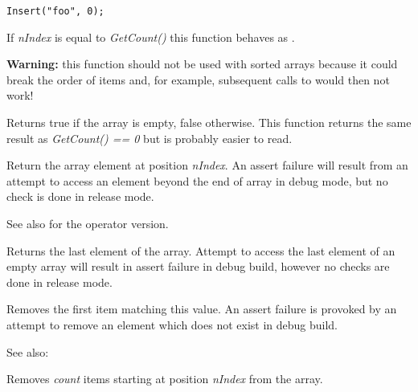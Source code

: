 \begin{verbatim}
Insert("foo", 0);
\end{verbatim}

If {\it nIndex} is equal to {\it GetCount()} this function behaves as 
.

{\bf Warning:} this function should not be used with sorted arrays because it
could break the order of items and, for example, subsequent calls to 
 would then not work!

\label{wxarraystringisempty}


Returns true if the array is empty, false otherwise. This function returns the
same result as {\it GetCount() == 0} but is probably easier to read.

\label{wxarraystringitem}


Return the array element at position {\it nIndex}. An assert failure will
result from an attempt to access an element beyond the end of array in debug
mode, but no check is done in release mode.

See also  for the operator
version.

\label{wxarraystringlast}


Returns the last element of the array. Attempt to access the last element of
an empty array will result in assert failure in debug build, however no checks
are done in release mode.

\label{wxarraystringremove}


Removes the first item matching this value. An assert failure is provoked by
an attempt to remove an element which does not exist in debug build.

See also: 

\label{wxarraystringremoveat}


Removes {\it count} items starting at position {\it nIndex} from the array.

